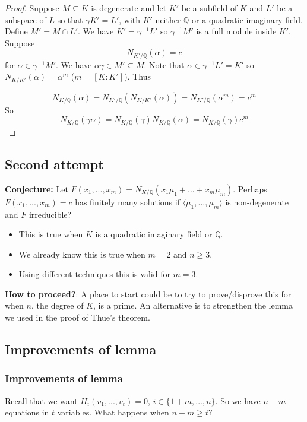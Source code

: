 \documentclass{beamer}
\newcommand{\mbb}[1]{\mathbb{#1}}
\numberwithin{equation}{section}
\begin{document}
\begin{frame}
\begin{proof}
	Suppose $M \subseteq K$ is degenerate and let $K'$ be a subfield of $K$ and $L'$ be a subspace of $L$ so that $\gamma K' = L'$, with $K'$ neither $\mbb Q$ or a quadratic imaginary field. Define $M' = M \cap L'$. We have $K' = \gamma^{-1} L'$ so $\gamma^{-1}M'$ is a full module inside $K'$. Suppose 
	$$N_{K' / \mbb Q}(\alpha) = c$$
	for $\alpha \in \gamma^{-1} M'$. We have $\alpha \gamma \in M' \subseteq M$. Note that $\alpha \in \gamma^{-1} L' = K'$ so $N_{K / K'}(\alpha) = \alpha^m$ ($m = [K : K']$). Thus 

	$$N_{K / \mbb Q}(\alpha) = N_{K' / \mbb Q}(N_{K / K'}(\alpha)) = N_{K' / \mbb Q}(\alpha^m) = c^m$$
	So 
	$$N_{K / \mbb Q}(\gamma \alpha) = N_{K / \mbb Q}(\gamma) N_{K / \mbb Q}(\alpha) = N_{K / \mbb Q}(\gamma)c^m$$
\end{proof}
\end{frame}




\subsection{Second attempt}
\begin{frame}
	\textbf{Conjecture:} Let $F(x_1, ..., x_m) = N_{K / \mbb Q}(x_1 \mu_1 + ... + x_m \mu_m)$. Perhaps $F(x_1, ..., x_m) = c$ has finitely many solutions if $\langle \mu_1, ..., \mu_m \rangle$ is non-degenerate and $F$ irreducible?
	\pause
	\begin{itemize}
		\item This is true when $K$ is a quadratic imaginary field or $\mbb Q$.
		\item We already know this is true when $m = 2$ and $n \geq 3$. \pause
		\item Using different techniques this is valid for $m = 3$.
	\end{itemize}
	\pause
	\textbf{How to proceed?}: A place to start could be to try to prove/disprove this for when $n$, the degree of $K$, is a prime.
	An alternative is to strengthen the lemma we used in the proof of Thue's theorem.
\end{frame}
\subsection{Improvements of lemma}
\begin{frame}
	\frametitle{Improvements of lemma}
	Recall that we want $H_i(v_1, ..., v_t) = 0$, $i \in \{1 + m,..., n\}$. So we have $n - m$ equations in $t$ variables. What happens when $n - m \geq t$? %

\end{frame}
\end{document}
